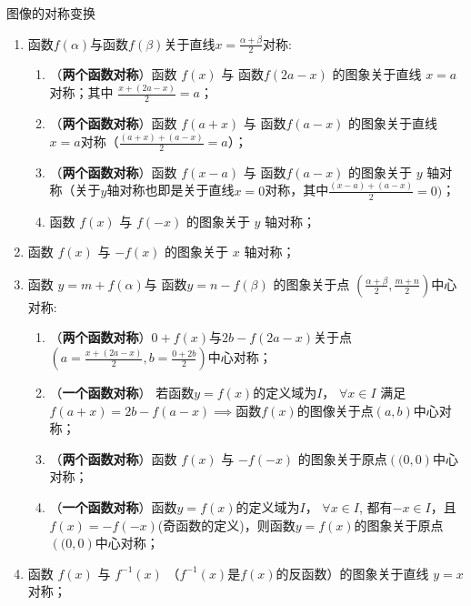 \begin{conclusion}{图像的对称变换}{}
\begin{enumerate}
\item \vspace{2mm} 函数$f(\alpha)$与函数$f(\beta)$关于直线$\displaystyle x=\frac{\alpha + \beta}{2}$对称:
\begin{enumerate}
\item \vspace{2mm} （\textbf{两个函数对称}）函数 $f(x)$ 与 函数$f(2a-x)$ 的图象关于直线 $x=a$ 对称；其中 $\displaystyle \frac{x+ (2a -x)}{2}= a$；
\item \vspace{2mm} （\textbf{两个函数对称}）函数 $f(a+x)$ 与 函数$f(a-x)$ 的图象关于直线 $x=a$对称（$\displaystyle \frac{(a+x)+(a-x)}{2}=a$）；
\item \vspace{2mm} （\textbf{两个函数对称}）函数 $f(x-a)$ 与 函数$f(a-x)$ 的图象关于 $y$ 轴对称（关于$y$轴对称也即是关于直线$x=0$对称，其中$\displaystyle \frac{(x-a)+(a-x)}{2}= 0 )$；
\item \vspace{2mm} 函数 $f(x)$ 与 $f(-x)$ 的图象关于 $y$ 轴对称；
\end{enumerate}
\item \vspace{2mm} 函数 $f(x)$ 与 $-f(x)$ 的图象关于 $x$ 轴对称；
\item \vspace{2mm} 函数 $y = m + f(\alpha)$与 函数$y = n - f(\beta)$ 的图象关于点 $\displaystyle (\frac{\alpha + \beta}{2}, \frac{m+n}{2})$中心对称:
\begin{enumerate}
\item \vspace{2mm} （\textbf{两个函数对称}）$0+f(x)$与$2b-f(2a-x)$关于点$\displaystyle (a=\frac{x+(2a-x)}{2}, b=\frac{0+2b}{2})$中心对称；
\item \vspace{2mm} （\textbf{一个函数对称}） 若函数$y=f(x)$的定义域为$I$， $\forall x \in I$ 满足 $f(a+x)=2b-f(a-x) \implies$函数$f(x)$的图像关于点$(a, b)$中心对称；
\item \vspace{2mm} （\textbf{两个函数对称}）函数 $f(x)$ 与 $-f(-x)$ 的图象关于原点$\left(( 0, 0 \right)$中心对称；
\item \vspace{2mm} （\textbf{一个函数对称}）函数$y=f(x)$的定义域为$I$， $\forall x \in I$, 都有$-x \in I$，且$f(x) = -f(-x)$(奇函数的定义)，则函数$y=f(x)$的图象关于原点$\left(( 0, 0 \right)$中心对称；
\end{enumerate}
\item \vspace{2mm} 函数 $f(x)$ 与 $f^{-1}(x)$ （$f^{-1}(x)$是$f(x)$的反函数）的图象关于直线 $y=x$ 对称；
\end{enumerate}
\end{conclusion}

